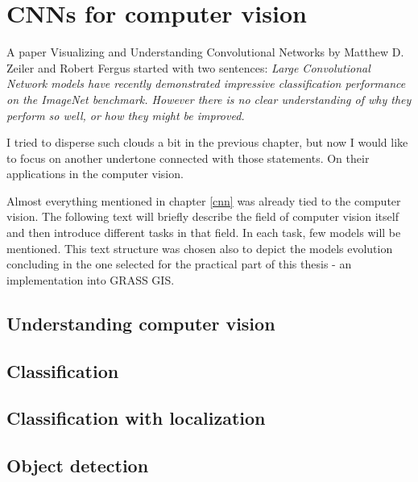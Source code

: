 \chapter{CNNs for computer vision}
\label{image-ann}

A paper Visualizing and Understanding Convolutional Networks by Matthew D. Zeiler and Robert Fergus \cite{zf-net} started with two sentences: \textit{Large Convolutional Network models have recently demonstrated impressive classification performance on the ImageNet benchmark. However there is no clear understanding of why they perform so well, or how they might be improved.}

I tried to disperse such clouds a bit in the previous chapter, but now I would like to focus on another undertone connected with those statements. On their applications in the computer vision.

Almost everything mentioned in chapter \ref{cnn} was already tied to the computer vision. The following text will briefly describe the field of computer vision itself and then introduce different tasks in that field. In each task, few  models will be mentioned. This text structure was chosen also to depict the models evolution concluding in the one selected for the practical part of this thesis - an implementation into GRASS GIS.


\section{Understanding computer vision}
\label{computer-vision}



\section{Classification}
\label{classification}


\section{Classification with localization}
\label{classification-localization}


\section{Object detection}
\label{object-detection}

